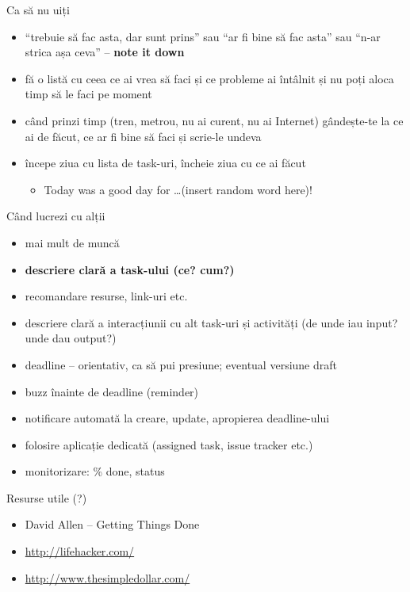 \documentclass{simple}
\begin{document}
\begin{frame}{Ca să nu uiți}
  \begin{itemize}
    \item ``trebuie să fac asta, dar sunt prins'' sau ``ar fi bine să fac
    asta'' sau ``n-ar strica așa ceva'' -- \textbf{note it down}
    \item fă o listă cu ceea ce ai vrea să faci și ce probleme ai întâlnit și
    nu poți aloca timp să le faci pe moment
    \item când prinzi timp (tren, metrou, nu ai curent, nu ai Internet)
    gândește-te la ce ai de făcut, ce ar fi bine să faci și scrie-le undeva
    \item începe ziua cu lista de task-uri, încheie ziua cu ce ai făcut
      \begin{itemize}
        \item Today was a good day for \ldots (insert random word here)!
      \end{itemize}
  \end{itemize}
\end{frame}

\begin{frame}{Când lucrezi cu alții}
  \begin{itemize}
    \item mai mult de muncă
    \item \textbf{descriere clară a task-ului (ce? cum?)}
    \item recomandare resurse, link-uri etc.
    \item descriere clară a interacțiunii cu alt task-uri și activități (de
    unde iau input? unde dau output?)
    \item deadline -- orientativ, ca să pui presiune; eventual versiune draft
    \item buzz înainte de deadline (reminder)
    \item notificare automată la creare, update, apropierea deadline-ului
    \item folosire aplicație dedicată (assigned task, issue tracker etc.)
    \item monitorizare: \% done, status
  \end{itemize}
\end{frame}

\begin{frame}{Resurse utile (?)}
  \begin{itemize}
    \item David Allen -- Getting Things Done
    \item \url{http://lifehacker.com/}
    \item \url{http://www.thesimpledollar.com/}
  \end{itemize}
\end{frame}
\end{document}
